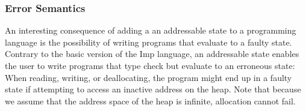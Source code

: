 
\subsubsection{Error Semantics}
\label{sec:error_semantics}
An interesting consequence of adding a an addressable state to a programming language is the possibility of writing programs that evaluate to a faulty state. Contrary to the basic version of the Imp language, an addressable state enables the user to write programs that type check but evaluate to an erroneous state: When reading, writing, or deallocating, the program might end up in a faulty state if attempting to access an inactive address on the heap. Note that because we assume that the address space of the heap is infinite, allocation cannot fail. 
